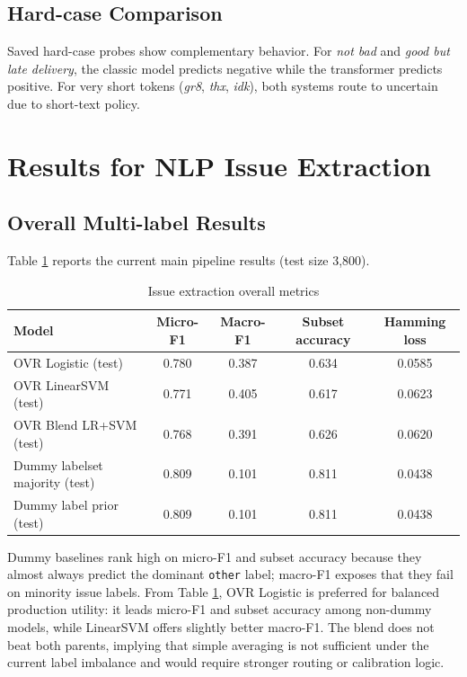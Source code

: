 \documentclass[12pt,a4paper]{article}
\begin{document}
\subsection{Hard-case Comparison}
Saved hard-case probes show complementary behavior. For \textit{not bad} and \textit{good but late delivery}, the classic model predicts negative while the transformer predicts positive. For very short tokens (\textit{gr8}, \textit{thx}, \textit{idk}), both systems route to uncertain due to short-text policy.

\section{Results for NLP Issue Extraction}
\subsection{Overall Multi-label Results}
Table \ref{tab:issue_overall} reports the current main pipeline results (test size 3,800).

\begin{table}[H]
\centering
\caption{Issue extraction overall metrics}
\label{tab:issue_overall}
\begin{tabular}{lcccc}
\toprule
Model & Micro-F1 & Macro-F1 & Subset accuracy & Hamming loss \\
\midrule
OVR Logistic (test) & 0.780 & 0.387 & 0.634 & 0.0585 \\
OVR LinearSVM (test) & 0.771 & 0.405 & 0.617 & 0.0623 \\
OVR Blend LR+SVM (test) & 0.768 & 0.391 & 0.626 & 0.0620 \\
Dummy labelset majority (test) & 0.809 & 0.101 & 0.811 & 0.0438 \\
Dummy label prior (test) & 0.809 & 0.101 & 0.811 & 0.0438 \\
\bottomrule
\end{tabular}
\end{table}

Dummy baselines rank high on micro-F1 and subset accuracy because they almost always predict the dominant \texttt{other} label; macro-F1 exposes that they fail on minority issue labels.
From Table \ref{tab:issue_overall}, OVR Logistic is preferred for balanced production utility: it leads micro-F1 and subset accuracy among non-dummy models, while LinearSVM offers slightly better macro-F1. The blend does not beat both parents, implying that simple averaging is not sufficient under the current label imbalance and would require stronger routing or calibration logic.
\end{document}
